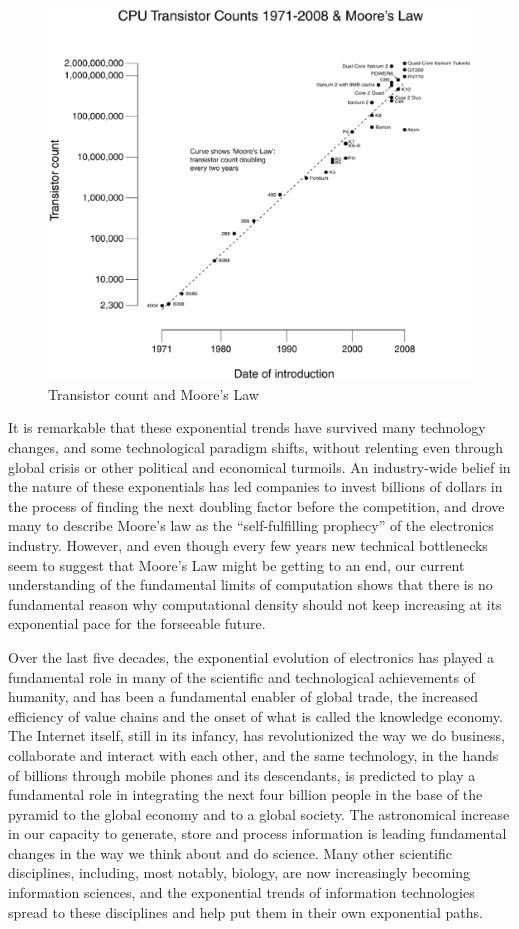 \documentclass[letter,11pt]{article}
\begin{document}
\begin{figure}
\includegraphics[width=\textwidth]{Transistor_Count_and_Moore's_Law_-_2008}
\caption{Transistor count and Moore's Law}
\label{moores-law}
\end{figure}

It is remarkable that these exponential trends have survived many technology
changes, and some technological paradigm shifts, without relenting even through
global crisis or other political and economical turmoils. An industry-wide
belief in the nature of these exponentials has led companies to invest billions
of dollars in the process of finding the next doubling factor before the
competition, and drove many to describe Moore's law as  the ``self-fulfilling
prophecy'' of the electronics industry. However, and even though every few
years new technical bottlenecks seem to suggest that Moore's Law might be
getting to an end, our current understanding of the fundamental limits of
computation shows that there is no fundamental reason why computational density
should not keep increasing at its exponential pace for the forseeable future.

Over the last five decades, the exponential evolution of electronics has
played a fundamental role in many of the scientific and technological
achievements of humanity, and has been a fundamental enabler of global trade,
the increased efficiency of value chains and the onset of what is called the
knowledge economy. The Internet itself, still in its infancy, has
revolutionized the way we do business, collaborate and interact with each
other, and the same technology, in the hands of billions through mobile phones
and its descendants, is predicted to play a fundamental role in integrating the
next four billion people in the base of the pyramid to the global economy and
to a global society. The astronomical increase in our capacity to generate,
store and process information is leading fundamental changes in the way we
think about and do science. Many other scientific disciplines, including, most
notably, biology, are now increasingly becoming information sciences, and the
exponential trends of information technologies spread to these disciplines and
help put them in their own exponential paths. 
\end{document}
